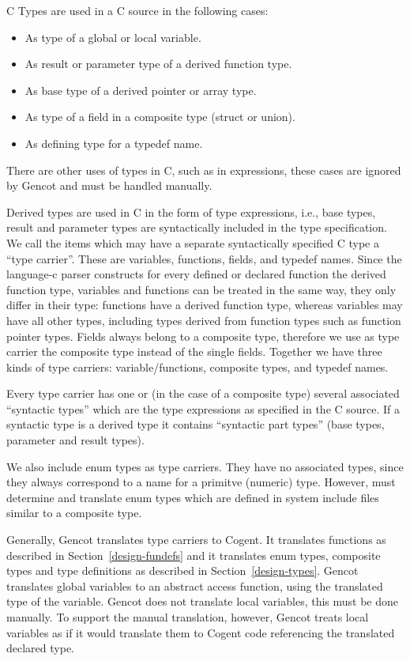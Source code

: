 C Types are used in a C source in the following cases:
\begin{itemize}
\item As type of a global or local variable.
\item As result or parameter type of a derived function type.
\item As base type of a derived pointer or array type.
\item As type of a field in a composite type (struct or union).
\item As defining type for a typedef name.
\end{itemize}
There are other uses of types in C, such as in  expressions, these cases are ignored by Gencot and 
must be handled manually.

Derived types are used in C in the form of type expressions, i.e., base types, result and parameter types are 
syntactically included in the type specification. We call the items which may have a separate syntactically
specified C type a ``type carrier''. These are variables, functions, fields, and typedef names. Since the language-c
parser constructs for every defined or declared function the derived function type, variables and functions
can be treated in the same way, they only differ in their type: functions have a derived function type, whereas
variables may have all other types, including types derived from function types such as function pointer types. Fields 
always belong to a composite type, therefore we use as type carrier the composite type instead of the single fields.
Together we have three kinds of type carriers: variable/functions, composite types, and typedef names.

Every type carrier has one or (in the case of a composite type) several associated ``syntactic types''
which are the type expressions as specified in the C source. If a syntactic type is a derived type it contains
``syntactic part types'' (base types, parameter and result types). 

We also include enum types as type carriers. They have no associated types, since they always correspond to a name 
for a primitve (numeric) type. However,  must determine and translate enum types which 
are defined in system include files similar to a composite type.

Generally, Gencot translates type carriers to Cogent. It translates functions as described in Section~\ref{design-fundefs}
and it translates enum types, composite types and type definitions as described in Section~\ref{design-types}.
Gencot translates global variables to an abstract access function, using the translated type of the variable.
Gencot does not translate local variables, this must be done manually. To support the manual translation, 
however, Gencot treats local variables as if it would translate them to Cogent code referencing the translated 
declared type.

